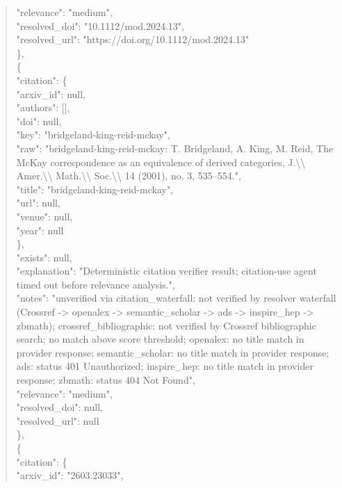 \documentclass[11pt]{article}
\begin{document}
\begin{quote}
      "relevance": "medium",\\
      "resolved\_doi": "10.1112/mod.2024.13",\\
      "resolved\_url": "https://doi.org/10.1112/mod.2024.13"\\
    \},\\
    \{\\
      "citation": \{\\
        "arxiv\_id": null,\\
        "authors": [],\\
        "doi": null,\\
        "key": "bridgeland-king-reid-mckay",\\
        "raw": "bridgeland-king-reid-mckay: T. Bridgeland, A. King, M. Reid, The McKay correspondence as an equivalence of derived categories, J.\textbackslash{}\textbackslash{} Amer.\textbackslash{}\textbackslash{} Math.\textbackslash{}\textbackslash{} Soc.\textbackslash{}\textbackslash{} 14 (2001), no. 3, 535--554.",\\
        "title": "bridgeland-king-reid-mckay",\\
        "url": null,\\
        "venue": null,\\
        "year": null\\
      \},\\
      "exists": null,\\
      "explanation": "Deterministic citation verifier result; citation-use agent timed out before relevance analysis.",\\
      "notes": "unverified via citation\_waterfall: not verified by resolver waterfall (Crossref -> openalex -> semantic\_scholar -> ads -> inspire\_hep -> zbmath); crossref\_bibliographic: not verified by Crossref bibliographic search; no match above score threshold; openalex: no title match in provider response; semantic\_scholar: no title match in provider response; ads: status 401 Unauthorized; inspire\_hep: no title match in provider response; zbmath: status 404 Not Found",\\
      "relevance": "medium",\\
      "resolved\_doi": null,\\
      "resolved\_url": null\\
    \},\\
    \{\\
      "citation": \{\\
        "arxiv\_id": "2603.23033",\\

\end{quote}
\end{document}

